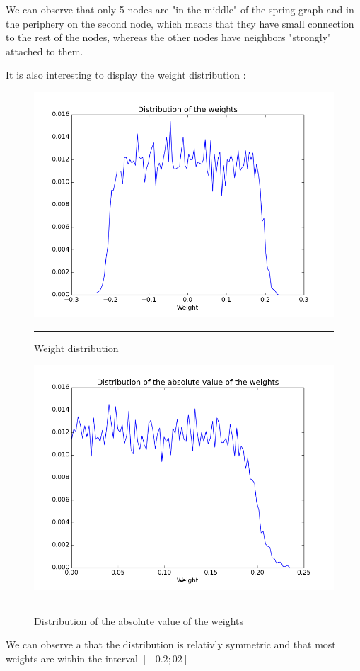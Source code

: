 We can observe that only 5 nodes are "in the middle" of the spring graph and in the periphery on the second node, which means that they have small connection to the rest of the nodes, whereas the other nodes have neighbors "strongly" attached to them. 

It is also interesting to display the weight distribution : 

\begin{figure}[htbp]
    \centering
    \includegraphics[scale=0.4]{Figures/weight_distribution.png}
    \rule{35em}{0.5pt}
    \caption[Weight distribution ]{Weight distribution}
    \label{fig:ring_lattice}
\end{figure}

\begin{figure}[htbp]
    \centering
    \includegraphics[scale=0.4]{Figures/abs_weight_distribution.png}
    \rule{35em}{0.5pt}
    \caption[Distribution of the absolute value of the weights]{Distribution of the absolute value of the weights}
    \label{fig:ring_lattice}
\end{figure}

We can observe a that the distribution is relativly symmetric and that most weights are within the interval $[-0.2;02] $







